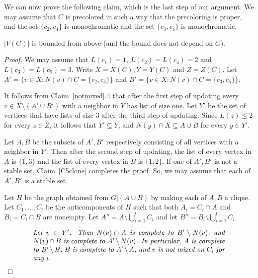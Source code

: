 \documentclass[11pt]{article}
\begin{document}
We can now prove the following claim, which is the last step of our argument.
We may assume that $C$ is precolored in such a way that the precoloring is 
proper, and the set $\{c_2,c_4\}$ is monochromatic and the set $\{c_3,c_4\}$ 
is monochromatic.
\begin{claim}\label{c5}
$|V(G)|$ is bounded from above (and the bound does not depend on $G$).
\end{claim}
\begin{proof} 
We may assume that $L(c_1)=1$, $L(c_2)=L(c_4)=2$  and  $L(c_3)=L(c_5)=3$. 
Write $X=X(C), Y=Y(C)$ and $Z=Z(C)$.
Let $A'=\{v\in X:N(v)\cap C=\{c_2,c_4\}\}$ and $B'=\{v\in X:N(v)\cap C=\{c_3,c_5\}\}$.  

It follows from Claim~\ref{notmixed}.4 that after the first step of updating 
every $v\in X\setminus(A'\cup B')$ with  a neighbor in $Y$
has list of size one.
Let $ Y' $ be the set of vertices that have lists of size 3 after the third
step of updating.
Since $L(z) \leq 2$ for every $z \in Z$, it follows that  $Y'\subseteq Y$,
and $N(y) \cap X \subseteq A \cup B$ for every $y \in Y'$.

	
Let $ A,B $ be the subsets of $ A',B' $ respectively consisting of all vertices with a neighbor in $ Y' $.  Then after the second step of updating, the list 
of every vertex in $A$ is $ \{1,3\} $ and the list of every vertex in $B$ is 
$\{1,2\}$. If one of $A',B'$ is not a stable set, Claim~\ref{C5clone} completes 
the proof.  So, we may assume that each of $A',B'$ is a stable set.

Let $ H $ be the graph obtained from $ G|(A\cup B) $ by making each of $ A,B $ a clique.
Let $ C_1,\ldots,C_t $ be the anticomponents of $ H $ such that both $ A_i=C_i \cap A $ and $ B_i=C_i \cap B $ are nonempty. 
Let $A''=A \setminus \bigcup_{i=1}^tC_i$ and let $B''=B_i \setminus \bigcup_{i=1}^t C_i$. 

 

\begin{equation}\label{notmixedanti}
\begin{minipage}[c]{0.8\textwidth}\em
Let $v \in Y'$. Then $N(v) \cap A$ is complete to $B' \setminus N(v)$, and
$N(v) \cap B$ is complete to $A' \setminus N(v)$. In particular, 
$A$ is complete to $B' \setminus B$, $B$ is complete to $A' \setminus A$,
and $v$ is not mixed on $C_i$ for any $i$.


\end{minipage}
\end{equation}
\end{proof}
\end{document}
